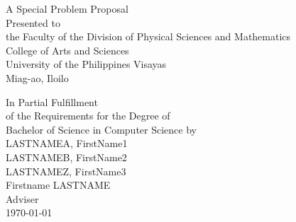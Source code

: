 \begin{titlepage}
\centering


\vspace{1.75cm}
A Special Problem Proposal\\
Presented to\\
the Faculty of the Division of Physical Sciences and Mathematics\\
College of Arts and Sciences\\
University of the Philippines Visayas\\
Miag-ao, Iloilo

\vspace{1.75cm}
In Partial Fulfillment\\
of the Requirements for the Degree of\\
Bachelor of Science in Computer Science
\vspace{1.75cm}
by\\

\vspace{1cm}
LASTNAMEA, FirstName1  \\
LASTNAMEB, FirstName2  \\
LASTNAMEZ, FirstName3  \\

\vspace{1.75cm}
Firstname LASTNAME \\
Adviser\\

\vspace{1.75cm}
\today
\end{titlepage}
